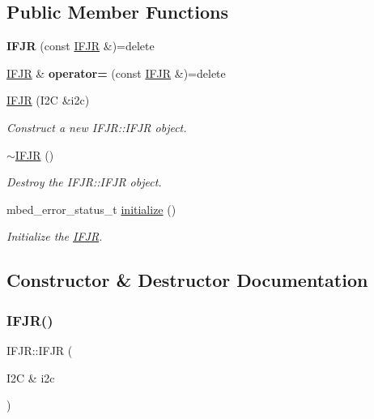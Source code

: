 \subsection*{Public Member Functions}
\begin{DoxyCompactItemize}
\item 
\mbox{\label{class_i_f_j_r_acd1ff6164e8cf8100df187b0abc4e654}} 
{\bfseries I\+F\+JR} (const \mbox{\hyperlink{class_i_f_j_r}{I\+F\+JR}} \&)=delete
\item 
\mbox{\label{class_i_f_j_r_a3d8ba875c73612ed2d426ba80d224c87}} 
\mbox{\hyperlink{class_i_f_j_r}{I\+F\+JR}} \& {\bfseries operator=} (const \mbox{\hyperlink{class_i_f_j_r}{I\+F\+JR}} \&)=delete
\item 
\mbox{\hyperlink{class_i_f_j_r_a1905b6c95f25b84526531afcfeb38b93}{I\+F\+JR}} (I2C \&i2c)
\begin{DoxyCompactList}\small\item\em Construct a new I\+F\+J\+R\+::\+I\+F\+JR object. \end{DoxyCompactList}\item 
\mbox{\hyperlink{class_i_f_j_r_a02cc4eb03b4a7fdacbdb8e7f940b7daa}{$\sim$\+I\+F\+JR}} ()
\begin{DoxyCompactList}\small\item\em Destroy the I\+F\+J\+R\+::\+I\+F\+JR object. \end{DoxyCompactList}\item 
mbed\+\_\+error\+\_\+status\+\_\+t \mbox{\hyperlink{class_i_f_j_r_a0a7d913d00e8573b613b980f17ed2fd4}{initialize}} ()
\begin{DoxyCompactList}\small\item\em Initialize the \mbox{\hyperlink{class_i_f_j_r}{I\+F\+JR}}. \end{DoxyCompactList}\end{DoxyCompactItemize}


\subsection{Constructor \& Destructor Documentation}
\mbox{\label{class_i_f_j_r_a1905b6c95f25b84526531afcfeb38b93}} 
\subsubsection{\texorpdfstring{IFJR()}{IFJR()}}
{\footnotesize\ttfamily I\+F\+J\+R\+::\+I\+F\+JR (\begin{DoxyParamCaption}\item[{I2C \&}]{i2c }\end{DoxyParamCaption})}



